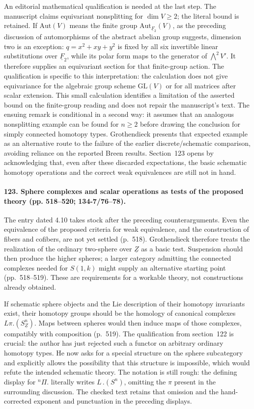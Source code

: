 An editorial mathematical qualification is needed at the last step. The manuscript claims equivariant nonsplitting for $\dim V\geq2$; the literal bound is retained. If $\mathrm{Aut}(V)$ means the finite group $\mathrm{Aut}_{\underline F_2}(V)$, as the preceding discussion of automorphisms of the abstract abelian group suggests, dimension two is an exception: $q=x^2+xy+y^2$ is fixed by all six invertible linear substitutions over $\underline F_2$, while its polar form maps to the generator of $\bigwedge^2V'$. It therefore supplies an equivariant section for that finite-group action. The qualification is specific to this interpretation: the calculation does not give equivariance for the algebraic group scheme $\mathrm{GL}(V)$ or for all matrices after scalar extension. This small calculation identifies a limitation of the asserted bound on the finite-group reading and does not repair the manuscript's text. The ensuing remark is conditional in a second way: it assumes that an analogous nonsplitting example can be found for $n\geq2$ before drawing the conclusion for simply connected homotopy types. Grothendieck presents that expected example as an alternative route to the failure of the earlier discrete/schematic comparison, avoiding reliance on the reported Breen results. Section~123 opens by acknowledging that, even after these discarded expectations, the basic schematic homotopy operations and the correct weak equivalences are still not in hand.

\paragraph{123. Sphere complexes and scalar operations as tests of the proposed theory (pp. 518--520; 134-7/76--78).}
The entry dated 4.10 takes stock after the preceding counterarguments. Even the equivalence of the proposed criteria for weak equivalence, and the construction of fibers and cofibers, are not yet settled (p.~518). Grothendieck therefore treats the realization of the ordinary two-sphere over $\underline Z$ as a basic test. Suspension should then produce the higher spheres; a larger category admitting the connected complexes needed for $S(1,k)$ might supply an alternative starting point (pp.~518--519). These are requirements for a workable theory, not constructions already obtained.

If schematic sphere objects and the Lie description of their homotopy invariants exist, their homotopy groups should be the homology of canonical complexes $L\pi.(S^n_{\underline Z})$. Maps between spheres would then induce maps of those complexes, compatibly with composition (p.~519). The qualification from section~122 is crucial: the author has just rejected such a functor on arbitrary ordinary homotopy types. He now asks for a special structure on the sphere subcategory and explicitly allows the possibility that this structure is impossible, which would refute the intended schematic theory. The notation is still rough: the defining display for ${}^n\Pi.$ literally writes $L\,.(S^n)$, omitting the $\pi$ present in the surrounding discussion. The checked text retains that omission and the hand-corrected exponent and punctuation in the preceding displays.

